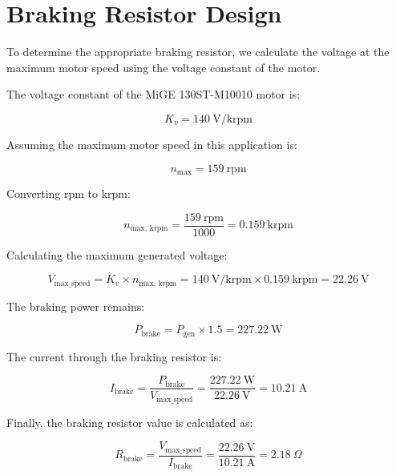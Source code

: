 \section{Braking Resistor Design}
\label{calcs:braking_resistor}

To determine the appropriate braking resistor, we calculate the voltage at the maximum motor speed using the voltage constant of the motor.

The voltage constant of the MiGE 130ST-M10010 motor is:

\[
K_v = 140\ \text{V/krpm}
\]

Assuming the maximum motor speed in this application is:

\[
n_{\text{max}} = 159\ \text{rpm}
\]

Converting rpm to krpm:

\[
n_{\text{max, krpm}} = \frac{159\ \text{rpm}}{1000} = 0.159\ \text{krpm}
\]

Calculating the maximum generated voltage:

\[
V_{\text{max\_speed}} = K_v \times n_{\text{max, krpm}} = 140\ \text{V/krpm} \times 0.159\ \text{krpm} = 22.26\ \text{V}
\]

The braking power remains:

\[
P_{\text{brake}} = P_{\text{gen}} \times 1.5 = 227.22\ \text{W}
\]

The current through the braking resistor is:

\[
I_{\text{brake}} = \frac{P_{\text{brake}}}{V_{\text{max\_speed}}} = \frac{227.22\ \text{W}}{22.26\ \text{V}} = 10.21\ \text{A}
\]

Finally, the braking resistor value is calculated as:

\[
R_{\text{brake}} = \frac{V_{\text{max\_speed}}}{I_{\text{brake}}} = \frac{22.26\ \text{V}}{10.21\ \text{A}} = 2.18\ \Omega
\]
